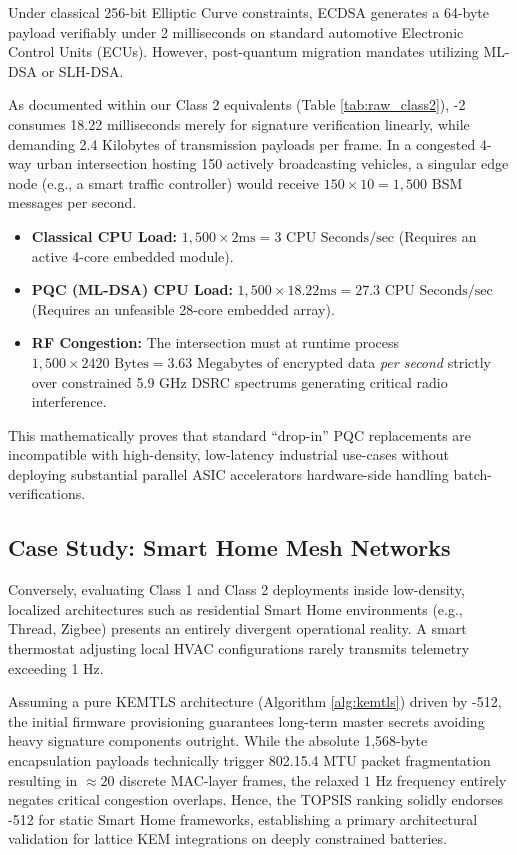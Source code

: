 Under classical 256-bit Elliptic Curve constraints, ECDSA generates a 64-byte payload verifiably under 2 milliseconds on standard automotive Electronic Control Units (ECUs). However, post-quantum migration mandates utilizing ML-DSA or SLH-DSA.

As documented within our Class 2 equivalents (Table \ref{tab:raw_class2}), \dilithium{}-2 consumes 18.22 milliseconds merely for signature verification linearly, while demanding 2.4 Kilobytes of transmission payloads per frame. In a congested 4-way urban intersection hosting 150 actively broadcasting vehicles, a singular edge node (e.g., a smart traffic controller) would receive $150 \times 10 = 1,500$ BSM messages per second.

\begin{itemize}
 \item \textbf{Classical CPU Load:} $1,500 \times 2\text{ms} = 3\text{ CPU Seconds/sec}$ (Requires an active 4-core embedded module).
 \item \textbf{PQC (ML-DSA) CPU Load:} $1,500 \times 18.22\text{ms} = 27.3\text{ CPU Seconds/sec}$ (Requires an unfeasible 28-core embedded array).
 \item \textbf{RF Congestion:} The intersection must at runtime process $1,500 \times 2420\text{ Bytes} = 3.63\text{ Megabytes}$ of encrypted data \textit{per second} strictly over constrained 5.9 GHz DSRC spectrums generating critical radio interference.
\end{itemize}

This mathematically proves that standard ``drop-in'' PQC replacements are incompatible with high-density, low-latency industrial use-cases without deploying substantial parallel ASIC accelerators hardware-side handling batch-verifications.

\subsection{Case Study: Smart Home Mesh Networks}

Conversely, evaluating Class 1 and Class 2 deployments inside low-density, localized architectures such as residential Smart Home environments (e.g., Thread, Zigbee) presents an entirely divergent operational reality. A smart thermostat adjusting local HVAC configurations rarely transmits telemetry exceeding 1 Hz. 

Assuming a pure KEMTLS architecture (Algorithm \ref{alg:kemtls}) driven by \kyber{}-512, the initial firmware provisioning guarantees long-term master secrets avoiding heavy signature components outright. While the absolute 1,568-byte encapsulation payloads technically trigger 802.15.4 MTU packet fragmentation resulting in $\approx 20$ discrete MAC-layer frames, the relaxed $1$ Hz frequency entirely negates critical congestion overlaps. Hence, the TOPSIS ranking solidly endorses \kyber{}-512 for static Smart Home frameworks, establishing a primary architectural validation for lattice KEM integrations on deeply constrained batteries.

